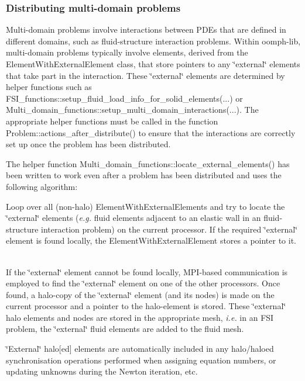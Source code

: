 \hypertarget{index_multi_domain}{}\subsubsection{Distributing multi-\/domain problems}\label{index_multi_domain}
Multi-\/domain problems involve interactions between P\+D\+Es that are defined in different domains, such as fluid-\/structure interaction problems. Within {\ttfamily oomph-\/lib}, multi-\/domain problems typically involve elements, derived from the {\ttfamily Element\+With\+External\+Element} class, that store pointers to any \char`\"{}external\char`\"{} elements that take part in the interaction. These \char`\"{}external\char`\"{} elements are determined by helper functions such as {\ttfamily F\+S\+I\+\_\+functions\+::setup\+\_\+fluid\+\_\+load\+\_\+info\+\_\+for\+\_\+solid\+\_\+elements}(...) or {\ttfamily Multi\+\_\+domain\+\_\+functions\+::setup\+\_\+multi\+\_\+domain\+\_\+interactions}(...). The appropriate helper functions must be called in the function {\ttfamily Problem\+::actions\+\_\+after\+\_\+distribute()} to ensure that the interactions are correctly set up once the problem has been distributed.

The helper function {\ttfamily Multi\+\_\+domain\+\_\+functions\+::locate\+\_\+external\+\_\+elements()} has been written to work even after a problem has been distributed and uses the following algorithm\+:
\begin{DoxyEnumerate}
\item Loop over all (non-\/halo) {\ttfamily Element\+With\+External\+Elements} and try to locate the \char`\"{}external\char`\"{} elements ({\itshape  e.\+g.} fluid elements adjacent to an elastic wall in an fluid-\/structure interaction problem) on the current processor. If the required \char`\"{}external\char`\"{} element is found locally, the {\ttfamily Element\+With\+External\+Element} stores a pointer to it. ~\newline
~\newline

\item If the \char`\"{}external\char`\"{} element cannot be found locally, M\+P\+I-\/based communication is employed to find the \char`\"{}external\char`\"{} element on one of the other processors. Once found, a halo-\/copy of the \char`\"{}external\char`\"{} element (and its nodes) is made on the current processor and a pointer to the halo-\/element is stored. These \char`\"{}external\char`\"{} halo elements and nodes are stored in the appropriate mesh, {\itshape  i.\+e.} in an F\+SI problem, the \char`\"{}external\char`\"{} fluid elements are added to the fluid mesh. ~\newline
~\newline

\end{DoxyEnumerate}\char`\"{}\+External\char`\"{} halo\mbox{[}ed\mbox{]} elements are automatically included in any halo/haloed synchronisation operations performed when assigning equation numbers, or updating unknowns during the Newton iteration, etc.

